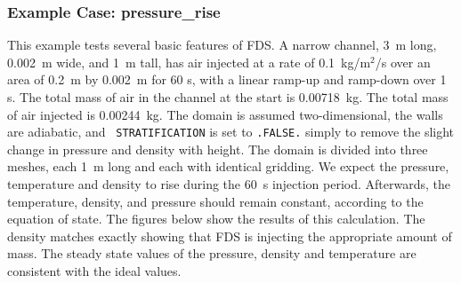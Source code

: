 \documentclass[11pt]{book}
\newcommand{\ct}{\tt\small}
\begin{document}
\subsubsection{Example Case: {\bf pressure\_rise}}

This example tests several basic features of FDS. A narrow channel, 3~m long, 0.002~m wide, and 1~m tall, has air injected at a rate of
0.1~kg/m$^2$/s over an area of 0.2~m by 0.002~m for 60 s, with a linear ramp-up and ramp-down over 1 s. The total mass of air in the channel at the
start is 0.00718~kg. The total mass of air injected is 0.00244~kg. The domain is assumed two-dimensional, the walls are adiabatic, and {\ct
STRATIFICATION} is set to {\ct .FALSE.} simply to remove the slight change in pressure and density with height.
The domain is divided into three meshes, each 1~m long and each with identical gridding.  We expect the pressure,
temperature and density to rise during the 60~s injection period. Afterwards, the
temperature, density, and pressure should remain constant, according to the equation of state.
The figures below show the results of this calculation.  The density matches exactly showing
that FDS is injecting the appropriate amount of mass. The steady state values of the pressure, density and temperature are consistent with
the ideal values.
\end{document}
